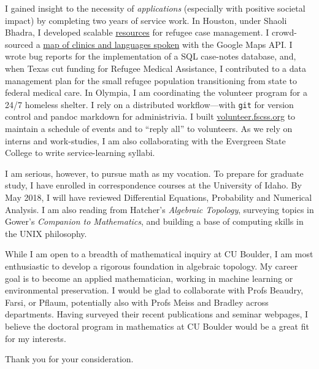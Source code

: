 \documentclass{article}
\begin{document}
I gained insight to the necessity of \emph{applications} (especially with
positive societal impact) by completing two years of service work.
In Houston, under Shaoli Bhadra, I developed scalable
\href{https://github.com/coltongrainger/ymca-resources}{resources} for
refugee case management. I crowd-sourced a
\href{https://drive.google.com/open?id=1kk9yn6-4nifHLIf2tGYbW_7PiYo\&usp=sharing}{map
of clinics and languages spoken} with the Google Maps API. I wrote bug
reports for the implementation of a SQL case-notes database, and, when
Texas cut funding for Refugee Medical Assistance, I contributed to a
data management plan for the small refugee population transitioning from 
state to federal medical care. In Olympia, I am coordinating the volunteer program for a
24/7 homeless shelter. I rely on a distributed workflow---with \texttt{git} for version control and
pandoc markdown for administrivia. I built
\href{http://volunteer.fscss.org}{volunteer.fscss.org} to maintain a
schedule of events and to ``reply all'' to volunteers. As we rely on
interns and work-studies, I am also collaborating with the 
Evergreen State College to write service-learning syllabi. 

I am serious, however, to pursue math as my vocation. To prepare for graduate 
study, I have enrolled in correspondence courses at the University of Idaho.
By May 2018, I will have reviewed Differential Equations,  
Probability and Numerical Analysis. I am also reading from 
Hatcher's \emph{Algebraic Topology}, surveying topics in Gower's \emph{Companion to Mathematics},
and building a base of computing skills in the UNIX philosophy. 

While I am open to a breadth of mathematical inquiry at CU Boulder, 
I am most enthusiastic to develop a rigorous foundation in algebraic topology.
My career goal is to become an applied mathematician, working in machine learning 
or environmental preservation. I would be glad to collaborate with
Profs Beaudry, Farsi, or Pflaum, potentially also with Profs Meiss and Bradley across departments.
Having surveyed their recent publications and seminar 
webpages, I believe the doctoral program in mathematics at CU Boulder would be a great fit for my
interests.

Thank you for your consideration. 
\end{document}

